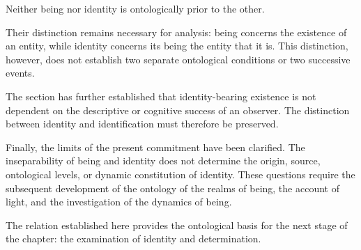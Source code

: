 Neither being nor identity is ontologically
prior to the other.

Their distinction remains necessary for
analysis: being concerns the existence of
an entity, while identity concerns its being
the entity that it is. This distinction,
however, does not establish two separate
ontological conditions or two successive
events.

The section has further established that
identity-bearing existence is not dependent
on the descriptive or cognitive success of
an observer. The distinction between identity
and identification must therefore be preserved.

Finally, the limits of the present commitment
have been clarified. The inseparability of
being and identity does not determine the
origin, source, ontological levels, or dynamic
constitution of identity. These questions
require the subsequent development of the
ontology of the realms of being, the account
of light, and the investigation of the dynamics
of being.

The relation established here provides the
ontological basis for the next stage of the
chapter: the examination of identity and
determination.


